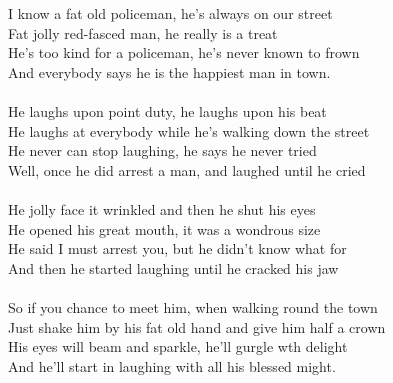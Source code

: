\vspace{10pt}
\par
I know a fat old policeman, he's always on our street\\
Fat jolly red-fasced man, he really is a treat\\
He's too kind for a policeman, he's never known to frown\\
And everybody says he is the happiest man in town.\\
\\
He laughs upon point duty, he laughs upon his beat\\
He laughs at everybody while he's walking down the street\\
He never can stop laughing, he says he never tried\\
Well, once he did arrest a man, and laughed until he cried\\
\\
He jolly face it wrinkled and then he shut his eyes\\
He opened his great mouth, it was a wondrous size\\
He said I must arrest you, but he didn't know what for\\
And then he started laughing until he cracked his jaw\\
\\
So if you chance to meet him, when walking round the town\\
Just shake him by his fat old hand and give him half a crown\\
His eyes will beam and sparkle, he'll gurgle wth delight\\
And he'll start in laughing with all his blessed might.
